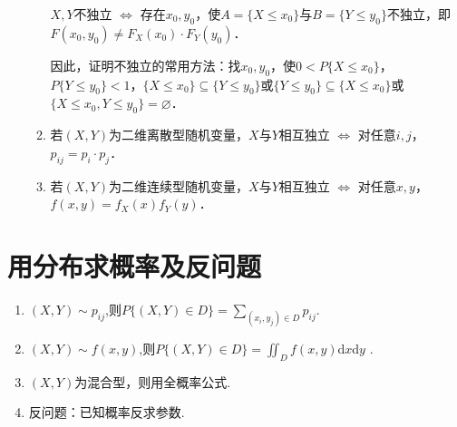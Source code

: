\begin{enumerate}
\begin{enumerate}
                        $X,Y$不独立 $\Leftrightarrow$ 存在$x_0,y_0$，使$A=\{X\leqslant x_0\}$与$B=\{Y\leqslant y_0\}$不独立，即$F(x_0,y_0)\neq F_X(x_0)\cdot F_Y(y_0)$．

                        因此，证明不独立的常用方法：找$x_0,y_0$，使$0<P\{X\leqslant x_0\}$，$P\{Y\leqslant y_0\}<1$，$\{X\leqslant x_0\}\subseteq\{Y\leqslant y_0\}$或$\{Y\leqslant y_0\}\subseteq\{X\leqslant x_0\}$或$\{X\leqslant x_0,Y\leqslant y_0\}=\varnothing$．
                  \item 若$(X,Y)$为二维离散型随机变量，$X$与$Y$相互独立 $\Leftrightarrow$ 对任意$i,j$，$p_{ij}=p_i\cdot p_j$．
                  \item 若$(X,Y)$为二维连续型随机变量，$X$与$Y$相互独立 $\Leftrightarrow$ 对任意$x,y$，$f(x,y)=f_X(x)f_Y(y)$．
            \end{enumerate}
\end{enumerate}

\section{用分布求概率及反问题}
\begin{enumerate}
      \item $(X,Y)\sim p_{ij}$,则$P\{ ( X, Y) \in D\} = \sum_{( x_{i}, y_{j}) \in D}p_{ij}$.
      \item $(X,Y)\sim f(x,y)$,则$P\{(X,Y)\in D\}=\iint_{D}f(x,y)$d$x$d$y$ .
      \item $(X,Y)$为混合型，则用全概率公式.
      \item 反问题：已知概率反求参数.
\end{enumerate}